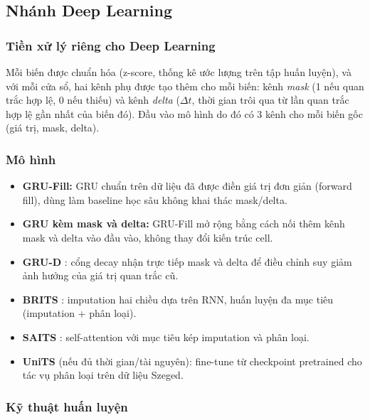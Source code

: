 \subsection{Nhánh Deep Learning}
\label{sec:nhanh-deep-learning}

\subsubsection{Tiền xử lý riêng cho Deep Learning}
\label{sec:tien-xu-ly-dl}

Mỗi biến được chuẩn hóa (z-score, thống kê ước lượng trên tập huấn luyện), và với mỗi
cửa sổ, hai kênh phụ được tạo thêm cho mỗi biến: kênh \emph{mask} (1 nếu quan trắc hợp
lệ, 0 nếu thiếu) và kênh \emph{delta} ($\Delta t$, thời gian trôi qua từ lần quan trắc
hợp lệ gần nhất của biến đó). Đầu vào mô hình do đó có 3 kênh cho mỗi biến gốc (giá trị,
mask, delta).

\subsubsection{Mô hình}
\label{sec:mo-hinh-dl}

\begin{itemize}
  \item \textbf{GRU-Fill:} GRU chuẩn trên dữ liệu đã được điền giá trị đơn giản (forward
        fill), dùng làm baseline học sâu không khai thác mask/delta.
  \item \textbf{GRU kèm mask và delta:} GRU-Fill mở rộng bằng cách nối thêm kênh mask và
        delta vào đầu vào, không thay đổi kiến trúc cell.
  \item \textbf{GRU-D} \cite{che2018grud}: cổng decay nhận trực tiếp mask và delta để
        điều chỉnh suy giảm ảnh hưởng của giá trị quan trắc cũ.
  \item \textbf{BRITS} \cite{cao2018brits}: imputation hai chiều dựa trên RNN, huấn
        luyện đa mục tiêu (imputation + phân loại).
  \item \textbf{SAITS} \cite{du2023saits}: self-attention với mục tiêu kép imputation và
        phân loại.
  \item \textbf{UniTS} \cite{gao2024units} (nếu đủ thời gian/tài nguyên): fine-tune từ
        checkpoint pretrained cho tác vụ phân loại trên dữ liệu Szeged.
\end{itemize}

\subsubsection{Kỹ thuật huấn luyện}
\label{sec:ky-thuat-huan-luyen-dl}

